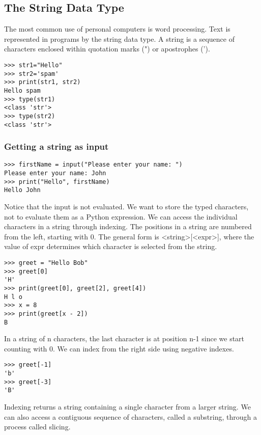 \documentclass[12pt,a4paper,final,twoside,onecolumn,titlepage]{book}
\begin{document}
\subsection{The String Data Type}
The most common use of personal computers is word processing. Text is represented in programs by the string data type.
A string is a sequence of characters enclosed within quotation marks (") or apostrophes (').
\begin{lstlisting}
>>> str1="Hello"
>>> str2='spam'
>>> print(str1, str2)
Hello spam
>>> type(str1)
<class 'str'>
>>> type(str2)
<class 'str'>
\end{lstlisting}

\subsubsection{Getting a string as input}
\begin{lstlisting}
>>> firstName = input("Please enter your name: ")
Please enter your name: John
>>> print("Hello", firstName)
Hello John
\end{lstlisting}
Notice that the input is not evaluated. We want to store the typed characters, not to evaluate them as a Python expression. We can access the individual characters in a string through indexing. The positions in a string are numbered from the left, starting with 0. The general form is <string>[<expr>], where the value of expr determines which character is selected from the string.
\begin{lstlisting}
>>> greet = "Hello Bob"
>>> greet[0]
'H'
>>> print(greet[0], greet[2], greet[4])
H l o
>>> x = 8
>>> print(greet[x - 2])
B
\end{lstlisting}
In a string of n characters, the last character is at position n-1 since we start counting with 0. We can index from the right side using negative indexes.
\begin{lstlisting}
>>> greet[-1]
'b'
>>> greet[-3]
'B'
\end{lstlisting}
Indexing returns a string containing a single character from a larger string. We can also access a contiguous sequence of characters, called a substring, through a process called slicing.
\end{document}
